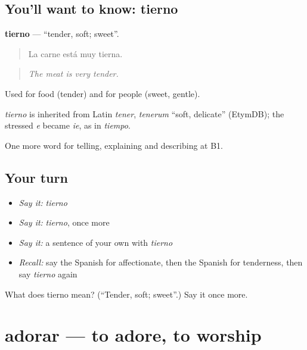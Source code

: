 \subsection*{You'll want to know: tierno}
\textbf{tierno} — \textquotedblleft{}tender, soft; sweet\textquotedblright{}.

\begin{quote}
La carne está muy tierna.
\end{quote}

\begin{quote}
\emph{The meat is very tender.}
\end{quote}

Used for food (tender) and for people (sweet, gentle).

\begin{cousinweb}
\emph{tierno} is inherited from Latin \emph{tener}, \emph{tenerum} \textquotedblleft{}soft, delicate\textquotedblright{} (EtymDB); the stressed \emph{e} became \emph{ie}, as in \emph{tiempo}.
\end{cousinweb}

\begin{grammarlens}[title={What you've built}]
One more word for telling, explaining and describing at B1.
\end{grammarlens}

\subsection*{Your turn}
\begin{itemize}
\raggedright
  \item \emph{Say it:} \emph{tierno}
  \item \emph{Say it:} \emph{tierno}, once more
  \item \emph{Say it:} a sentence of your own with \emph{tierno}
  \item \emph{Recall:} say the Spanish for affectionate, then the Spanish for tenderness, then say \emph{tierno} again
\end{itemize}

\begin{tcolorbox}[breakable,colback=teal!4,colframe=teal!35!black,title={Before you move on}]
What does tierno mean? (\textquotedblleft{}Tender, soft; sweet\textquotedblright{}.) Say it once more.
\end{tcolorbox}
\section[adorar]{adorar — to adore, to worship}

